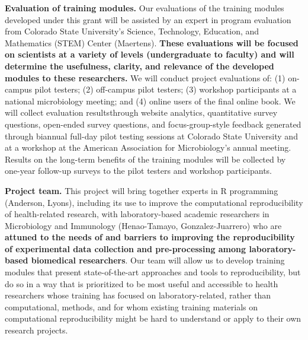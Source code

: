 \documentclass[pdftex,english,11pt,parskip=half]{scrartcl}
\begin{document}
\textbf{Evaluation of training modules.} Our evaluations of the training modules developed under this grant will be assisted by an expert in program evaluation from Colorado State University's Science, Technology, Education, and Mathematics (STEM) Center (Maertens). \textbf{These evaluations will be focused on scientists at a variety of levels (undergraduate to faculty) and will determine the usefulness, clarity, and relevance of the developed modules to these researchers.} We will conduct project evaluations of: (1) on-campus pilot testers; (2) off-campus pilot testers; (3) workshop participants at a national microbiology meeting; and (4) online users of the final online book. We will collect evaluation resultsthrough website analytics, quantitative survey questions, open-ended survey questions, and focus-group-style feedback generated through biannual full-day pilot testing sessions at Colorado State University and at a workshop at the American Association for Microbiology's annual meeting. Results on the long-term benefits of the training modules will be collected by one-year follow-up surveys to the pilot testers and workshop participants.


\textbf{Project team.}  This project will bring together experts in R programming (Anderson, Lyons), including its use to improve the computational reproducibility of health-related research, with laboratory-based academic researchers in Microbiology and Immunology (Henao-Tamayo, Gonzalez-Juarrero) who are \textbf{attuned to the needs of and barriers to improving the reproducibility of experimental data collection and pre-processing among laboratory-based biomedical researchers}. Our team will allow us to develop training modules that present state-of-the-art approaches and tools to reproducibility, but do so in a way that is prioritized to be most useful and accessible to health researchers whose training has focused on laboratory-related, rather than computational, methods, and for whom existing training materials on computational reproducibility might be hard to understand or apply to their own research projects. 
\end{document}
